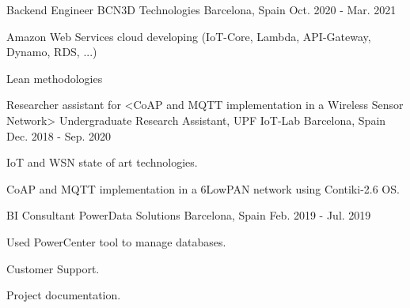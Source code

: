 


\begin{cventries}


\cventry
{Backend Engineer} %
{BCN3D Technologies} %
{Barcelona, Spain} %
{Oct. 2020 - Mar. 2021} %
{ %
\begin{cvitems}
\item {Amazon Web Services cloud developing (IoT-Core, Lambda, API-Gateway, Dynamo, RDS, ...)}
\item {Lean methodologies}
\end{cvitems} 
}

\cventry
{Researcher assistant for <CoAP and MQTT implementation in a Wireless Sensor Network>} %
{Undergraduate Research Assistant, UPF IoT-Lab} %
{Barcelona, Spain} %
{Dec. 2018 - Sep. 2020} %
{ %
\begin{cvitems}
\item {IoT and WSN state of art technologies.}
\item {CoAP and MQTT implementation in a 6LowPAN network using Contiki-2.6 OS.}
\end{cvitems} 
}


\cventry
{BI Consultant} %
{PowerData Solutions} %
{Barcelona, Spain} %
{Feb. 2019 - Jul. 2019} %
{ %
\begin{cvitems}
\item {Used PowerCenter tool to manage databases.}
\item {Customer Support.}
\item {Project documentation.}
\end{cvitems}
}


\end{cventries}

